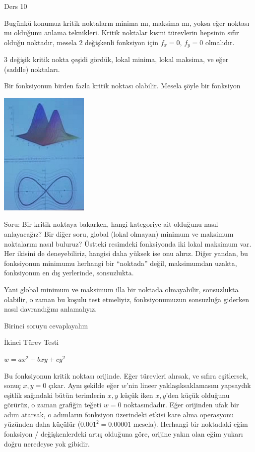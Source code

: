 \documentclass[12pt,fleqn]{article}\usepackage{../../common}
\begin{document}
Ders 10

Bugünkü konumuz kritik noktaların minima mı, maksima mı, yoksa eğer noktası
mı olduğunu anlama teknikleri. Kritik noktalar kısmi türevlerin hepsinin
sıfır olduğu noktadır, mesela 2 değişkenli fonksiyon için $f_x=0$, $f_y=0$
olmalıdır. 

3 değişik kritik nokta çeşidi gördük, lokal minima, lokal maksima, ve
eğer (saddle) noktaları. 

Bir fonksiyonun birden fazla kritik noktası olabilir. Mesela şöyle bir
fonksiyon

\begin{center}
\includegraphics[height=6cm]{10_1.png}
\end{center}

Soru: Bir kritik noktaya bakarken, hangi kategoriye ait olduğunu nasıl
anlayacağız? Bir diğer soru, global (lokal olmayan) minimum ve maksimum
noktalarını nasıl buluruz?  Üstteki resimdeki fonksiyonda iki lokal maksimum
var. Her ikisini de deneyebiliriz, hangisi daha yüksek ise onu alırız. Diğer
yandan, bu fonksiyonun minimumu herhangi bir ``noktada'' değil, maksimumdan
uzakta, fonksiyonun en dış yerlerinde, sonsuzlukta.

Yani global minimum ve maksimum illa bir noktada olmayabilir, sonsuzlukta
olabilir, o zaman bu koşulu test etmeliyiz, fonksiyonumuzun sonsuzluğa
giderken nasıl davrandığını anlamalıyız.

Birinci soruyu cevaplayalım

İkinci Türev Testi

$w = ax^2 + bxy + cy^2$

Bu fonksiyonun kritik noktası orijinde. Eğer türevleri alırsak, ve sıfıra
eşitlersek, sonuç $x,y=0$ çıkar. Aynı şekilde eğer $w$'nin lineer
yaklaşıksaklamasını yapsaydık eşitlik sağındaki bütün terimlerin $x,y$
küçük iken $x,y$'den küçük olduğunu görürüz, o zaman grafiğin teğeti $w=0$
noktasındadır. Eğer orijinden ufak bir adım atarsak, o adımların fonksiyon
üzerindeki etkisi kare alma operasyonu yüzünden daha küçülür ($0.001^2 =
0.00001$ mesela). Herhangi bir noktadaki eğim fonksiyon / değişkenlerdeki artış
olduğuna göre, orijine yakın olan eğim yukarı doğru neredeyse yok gibidir.
\end{document}
